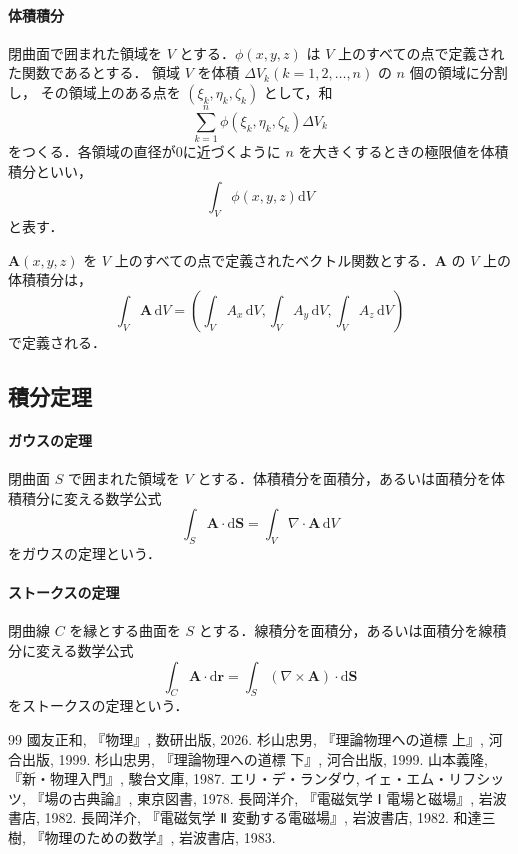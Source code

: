 \documentclass[11pt, a4paper]{ltjsarticle}
\numberwithin{equation}{section}
\begin{document}
\paragraph{体積積分}
閉曲面で囲まれた領域を $V$ とする．$\phi \left( x, y, z \right)$ は $V$ 上のすべての点で定義された関数であるとする．
領域 $V$ を体積 $\Delta V_k \left( k = 1, 2, \dots, n \right)$ の $n$ 個の領域に分割し，
その領域上のある点を $\left( \xi_k, \eta_k, \zeta_k \right)$ として，和
\[
  \sum_{k = 1}^{n} \phi \left( \xi_k, \eta_k, \zeta_k \right) \Delta V_k
\]
をつくる．各領域の直径が0に近づくように $n$ を大きくするときの極限値を体積積分といい，
\[
  \int_V \phi \left( x, y, z \right) \mathrm{d}V
\]
と表す．

$\bm{A} \left( x, y, z \right) $ を $V$ 上のすべての点で定義されたベクトル関数とする．$\bm{A}$ の $V$ 上の体積積分は，
\[
  \int_V \bm{A} \, \mathrm{d}V = \left( \int_V A_x \, \mathrm{d}V, \int_V A_y \, \mathrm{d}V, \int_V A_z \, \mathrm{d}V \right)
\]
で定義される．

\subsection{積分定理}
\paragraph{ガウスの定理}
閉曲面 $S$ で囲まれた領域を $V$ とする．体積積分を面積分，あるいは面積分を体積積分に変える数学公式
\begin{equation}
  \int_S \bm{A} \cdot \mathrm{d}\bm{S} = \int_V \nabla \cdot \bm{A} \, \mathrm{d}V
\end{equation}
をガウスの定理という．
\paragraph{ストークスの定理}
閉曲線 $C$ を縁とする曲面を $S$ とする．線積分を面積分，あるいは面積分を線積分に変える数学公式
\begin{equation}
  \int_C \bm{A} \cdot \mathrm{d}\bm{r} = \int_S \left( \nabla \times \bm{A} \right) \cdot \mathrm{d}\bm{S}
\end{equation}
をストークスの定理という．


\begin{thebibliography}{99}
  國友正和, 『物理』, 数研出版, 2026.
  杉山忠男, 『理論物理への道標 上』, 河合出版, 1999.
  杉山忠男, 『理論物理への道標 下』, 河合出版, 1999.
  山本義隆, 『新・物理入門』, 駿台文庫, 1987.
  エリ・デ・ランダウ, イェ・エム・リフシッツ, 『場の古典論』, 東京図書, 1978.
  長岡洋介, 『電磁気学 Ⅰ 電場と磁場』, 岩波書店, 1982.
  長岡洋介, 『電磁気学 Ⅱ 変動する電磁場』, 岩波書店, 1982.
  和達三樹, 『物理のための数学』, 岩波書店, 1983.
\end{thebibliography}
\end{document}
